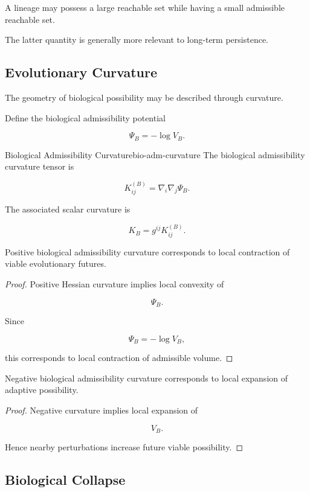 \documentclass[12pt,twoside,openright]{book}
\newenvironment{prop}
{\begin{proposition}{}{}}
{\end{proposition}}
\begin{document}
A lineage may possess a large reachable set while having
a small admissible reachable set.

The latter quantity is generally more relevant to
long-term persistence.

\subsection{Evolutionary Curvature}

The geometry of biological possibility may be described
through curvature.

Define the biological admissibility potential

\[
\Psi_B
=
-\log V_B.
\]

\begin{definition}{Biological Admissibility Curvature}{bio-adm-curvature}
The biological admissibility curvature tensor is

\[
K^{(B)}_{ij}
=
\nabla_i\nabla_j\Psi_B.
\]
\end{definition}

The associated scalar curvature is

\[
K_B
=
g^{ij}
K^{(B)}_{ij}.
\]

\begin{prop}
Positive biological admissibility curvature corresponds
to local contraction of viable evolutionary futures.
\end{prop}

\begin{proof}
Positive Hessian curvature implies local convexity of

\[
\Psi_B.
\]

Since

\[
\Psi_B=-\log V_B,
\]

this corresponds to local contraction of admissible
volume.
\end{proof}

\begin{prop}
Negative biological admissibility curvature corresponds
to local expansion of adaptive possibility.
\end{prop}

\begin{proof}
Negative curvature implies local expansion of

\[
V_B.
\]

Hence nearby perturbations increase future viable
possibility.
\end{proof}

\subsection{ Biological Collapse}
\end{document}
